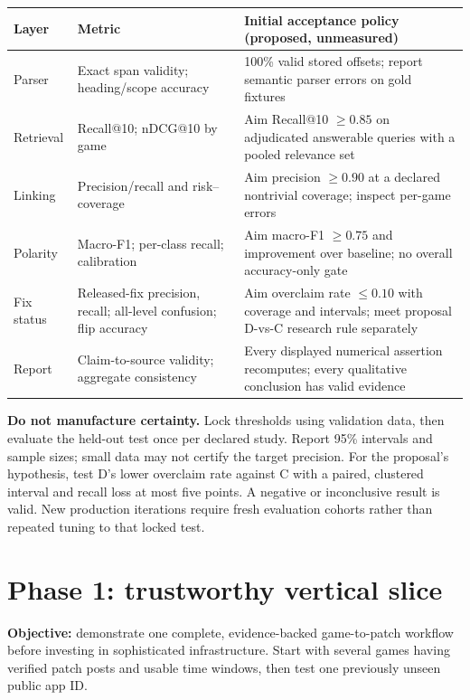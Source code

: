 \documentclass[10pt,letterpaper]{article}
\newcommand{\key}[1]{\textbf{\color{ink}#1}}
\newcommand{\nextsection}[1]{\clearpage\section{#1}}
\begin{document}
\begin{tabularx}{\linewidth}{p{1.0in}YY}
\toprule
Layer & Metric & Initial acceptance policy (proposed, unmeasured) \\
\midrule
Parser & Exact span validity; heading/scope accuracy & 100\% valid stored offsets; report semantic parser errors on gold fixtures \\
Retrieval & Recall@10; nDCG@10 by game & Aim Recall@10 $\geq 0.85$ on adjudicated answerable queries with a pooled relevance set \\
Linking & Precision/recall and risk--coverage & Aim precision $\geq 0.90$ at a declared nontrivial coverage; inspect per-game errors \\
Polarity & Macro-F1; per-class recall; calibration & Aim macro-F1 $\geq 0.75$ and improvement over baseline; no overall accuracy-only gate \\
Fix status & Released-fix precision, recall; all-level confusion; flip accuracy & Aim overclaim rate $\leq 0.10$ with coverage and intervals; meet proposal D-vs-C research rule separately \\
Report & Claim-to-source validity; aggregate consistency & Every displayed numerical assertion recomputes; every qualitative conclusion has valid evidence \\
\bottomrule
\end{tabularx}

\key{Do not manufacture certainty.} Lock thresholds using validation data, then evaluate the held-out test once per declared study. Report 95\% intervals and sample sizes; small data may not certify the target precision. For the proposal's hypothesis, test D's lower overclaim rate against C with a paired, clustered interval and recall loss at most five points. A negative or inconclusive result is valid. New production iterations require fresh evaluation cohorts rather than repeated tuning to that locked test.

\nextsection{Phase 1: trustworthy vertical slice}
\key{Objective:} demonstrate one complete, evidence-backed game-to-patch workflow before investing in sophisticated infrastructure. Start with several games having verified patch posts and usable time windows, then test one previously unseen public app ID.
\end{document}
